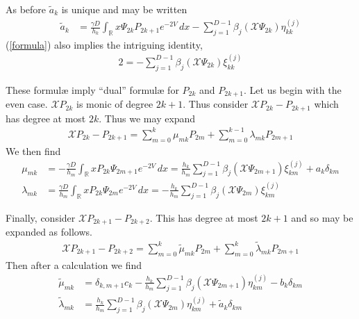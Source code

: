 \documentclass[12pt]{article}
\theoremstyle{definition}
\begin{document}
As before $\tilde{a}_k$ is unique and may be written
\begin{align*}
\tilde{a}_k &= \frac{\gamma D}{h_k}\int_\mathbb{R} x \Psi_{2k} P_{2k+1} e^{-2V}\, dx  -  \sum_{j=1}^{D-1} \beta_j(\mathscr{X}\Psi_{2k} ) \eta^{(j)}_{kk}
\end{align*}
(\ref{formula}) also implies the intriguing identity,
\begin{align}\label{intriguing}
2  = - \sum_{j=1}^{D-1} \beta_j(\mathscr{X}\Psi_{2k} )  \xi_{kk}^{(j)}
\end{align}

These formulæ imply \enquote{dual} formulæ for $P_{2k}$ and $P_{2k+1}$. Let us begin with the even case. $\mathscr{X} P_{2k}$ is monic of degree $2k+1$. Thus consider $\mathscr{X} P_{2k} - P_{2k+1}$ which has degree at most $2k$. Thus we may expand
\begin{align}
\mathscr{X} P_{2k} - P_{2k+1} = \sum_{m= 0}^{k} \mu_{mk} P_{2m} +  \sum_{m = 0}^{k-1} \lambda_{mk} P_{2m+1}
\end{align}
We then find
\begin{align*}
\mu_{mk} &= -\frac{\gamma D}{h_m} \int_\mathbb{R} x P_{2k} \Psi_{2m+1} e^{-2V}\, dx = \frac{h_k}{h_m}  \sum_{j=1}^{D-1} \beta_j(\mathscr{X} \Psi_{2m+1}) \xi_{km}^{(j)} + a_k \delta_{km} \\
\lambda_{mk} & =  \frac{\gamma D}{h_m}\int_\mathbb{R} x P_{2k} \Psi_{2m} e^{-2V} \, dx =  - \frac{h_k}{h_m}  \sum_{j=1}^{D-1} \beta_j( \mathscr{X} \Psi_{2m})\xi_{km}^{(j)}
\end{align*}

Finally, consider $ \mathscr{X} P_{2k+1} - P_{2k+2}$. This has degree at most $2k+1$ and so may be expanded as follows.
\begin{align}
 \mathscr{X} P_{2k+1} - P_{2k+2} = \sum_{m=0}^k \tilde{\mu}_{mk} P_{2m} + \sum_{m=0}^k \tilde{\lambda}_{mk} P_{2m+1}
\end{align}
Then after a calculation we find
\begin{align*}
\tilde{\mu}_{mk} &= \delta_{k,m+1}c_k -  \frac{h_k}{h_m} \sum_{j=1}^{D-1} \beta_j(\mathscr{X} \Psi_{2m+1}) \eta_{km}^{(j)} - b_k \delta_{km} \\
\tilde{\lambda}_{mk} &= \frac{h_k}{h_m}  \sum_{j=1}^{D-1} \beta_j (\mathscr{X} \Psi_{2m}) \eta_{km}^{(j)} + \tilde{a}_k \delta_{km}
\end{align*}
\end{document}
